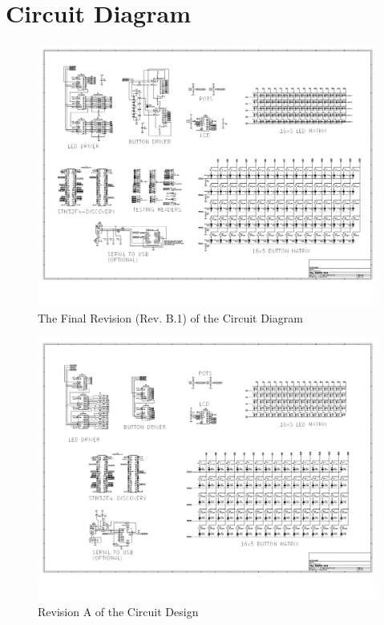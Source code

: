 \documentclass[12pt,a4paper]{report}
\begin{document}
\chapter{Circuit Diagram}
\begin{figure}[h!]
\begin{center}
	\includegraphics[width = \textwidth, angle=0, origin=c]{../Skripsie/Layout_05042019.pdf}
	\caption{The Final Revision (Rev. B.1) of the Circuit Diagram}
\end{center}
\end{figure}
\begin{figure}[h!]
	\begin{center}
		\includegraphics[width = \textwidth, angle=0, origin=c]{../Skripsie/Layout_28022019.pdf}
		\caption{Revision A of the Circuit Design}
	\end{center}
\end{figure}
\end{document}
